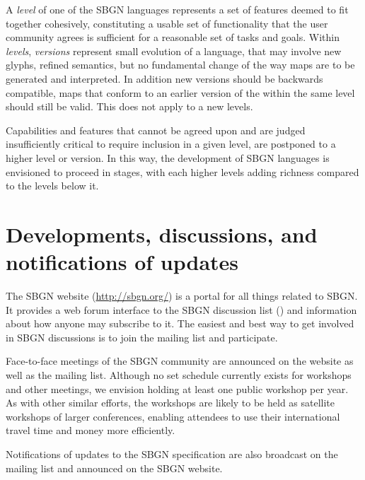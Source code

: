 A \emph{level} of one of the SBGN languages represents a set of
features deemed to fit together cohesively, constituting a usable set
of functionality that the user community agrees is sufficient for a
reasonable set of tasks and goals.  Within \emph{levels},
\emph{versions} represent small evolution of a language, that may
involve new glyphs, refined semantics, but no fundamental change of
the way maps are to be generated and interpreted. In addition new
versions should be backwards compatible, \ie \PD maps that conform to
an earlier version of the \PDl within the same level should still be
valid.  This does not apply to a new levels. 

Capabilities and features that cannot be agreed upon and are judged
insufficiently critical to require inclusion in a given level, are
postponed to a higher level or version.  In this way, the development
of SBGN languages is envisioned to proceed in stages, with each higher
levels adding richness compared to the levels below it.

\section{Developments, discussions, and notifications of updates}
\label{sec:discussions}

The SBGN website (\url{http://sbgn.org/}) is a portal for all things 
related to SBGN.  It provides a web forum interface to the SBGN discussion 
list () and information about how anyone 
may subscribe to it.  The easiest and best way to get involved in SBGN 
discussions is to join the mailing list and participate.

Face-to-face meetings of the SBGN community are announced on the website as 
well as the mailing list.  Although no set schedule currently exists for 
workshops and other meetings, we envision holding at least one public 
workshop per year.  As with other similar efforts, the workshops are likely 
to be held as satellite workshops of larger conferences, enabling attendees 
to use their international travel time and money more efficiently.

Notifications of updates to the SBGN specification are also broadcast on 
the mailing list and announced on the SBGN website.

